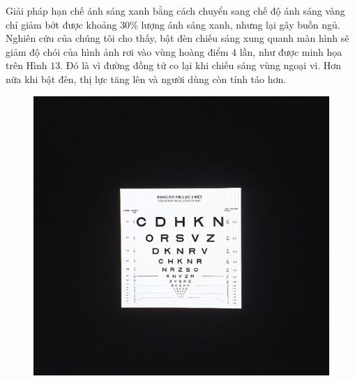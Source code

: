 \begin{multicols}{2}
	\vskip 0.1cm
	Giải pháp hạn chế ánh sáng xanh bằng cách chuyển sang chế độ ánh sáng vàng chỉ giảm bớt được khoảng $30\%$ lượng ánh sáng xanh, nhưng lại gây buồn ngủ. 
	\vskip 0.1cm
	Nghiên cứu của chúng tôi cho thấy, bật đèn chiếu sáng xung quanh màn hình sẽ giảm độ chói của hình ảnh rơi vào vùng hoàng điểm $4$ lần, như được minh họa trên Hình $13$. Đó là vì đường đồng tử co lại khi chiếu sáng vùng ngoại vi. Hơn nữa khi bật đèn, thị lực tăng lên và người dùng còn tỉnh táo hơn.
	\begin{figure}[H]
		\vspace*{-5pt}
		\centering
		\captionsetup{labelformat= empty, justification=centering}
		\includegraphics[width= 1\linewidth]{13a}
		

\end{figure}
\end{multicols}
